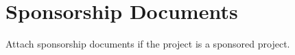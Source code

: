 \chapter{Sponsorship Documents}

Attach sponsorship documents if the project is a sponsored project. 